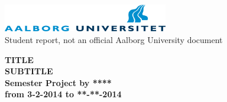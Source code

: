 \thispagestyle{empty} %
\begin{center}
	\includegraphics[height=1.2cm]{media/aau-logo}\\
	\vspace{0.25cm}
	Student report, not an official Aalborg University document
\end{center} 

\vspace{1cm}
\begin{center}
\textbf{\Huge {TITLE}} \\ \vspace{0.5cm}
\textbf{\huge {SUBTITLE}} \\ \vspace{1cm}
\textbf{\Large Semester Project by ****}\\ \vspace{0.5cm}
\textbf{\large from 3-2-2014 to **-**-2014}\\
\end{center}

\vspace{0.25cm}


\thispagestyle{empty}

\newpage
\thispagestyle{empty}
\mbox{}


